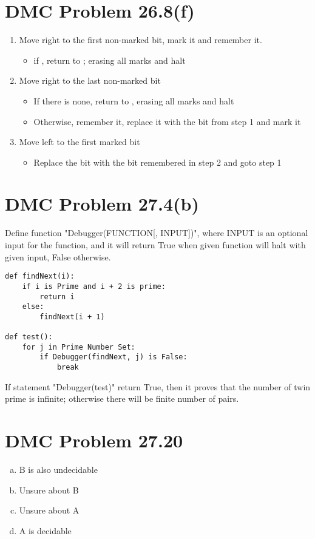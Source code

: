 \documentclass{article}
\begin{document}
\section{DMC Problem 26.8(f)}
\begin{enumerate}[1)]
    \item Move right to the first non-marked bit, mark it and remember it.
        \begin{itemize}
            \item if \textvisiblespace, return to \text{*}; erasing all marks and halt
        \end{itemize}
    \item Move right to the last non-marked bit
        \begin{itemize}
            \item If there is none, return to \text{*}, erasing all marks and halt
            \item Otherwise, remember it, replace it with the bit from step 1 and mark it
        \end{itemize}
    \item Move left to the first marked bit
        \begin{itemize}
            \item Replace the bit with the bit remembered in step 2 and goto step 1
        \end{itemize}
\end{enumerate}

\section{DMC Problem 27.4(b)}
Define function "Debugger(FUNCTION[, INPUT])", where INPUT is an optional input for the function, and it will return True when given function will halt with given input, False otherwise.
\begin{lstlisting}
def findNext(i):
    if i is Prime and i + 2 is prime:
        return i
    else:
        findNext(i + 1)

def test():
    for j in Prime Number Set:
        if Debugger(findNext, j) is False:
            break
\end{lstlisting}

If statement "Debugger(test)" return True, then it proves that the number of twin prime is infinite; otherwise there will be finite number of pairs. 

\section{DMC Problem 27.20}
\begin{enumerate}[a)]
    \item B is also undecidable
    \item Unsure about B
    \item Unsure about A
    \item A is decidable
\end{enumerate}
\end{document}
